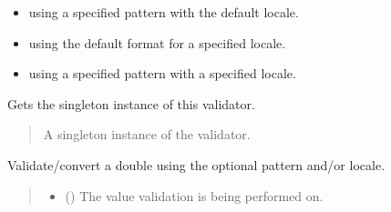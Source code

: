 \documentclass[letterpaper,10pt,english]{sphinxmanual}
\begin{document}
\begin{fulllineitems}
\begin{itemize}
\item {} 
\sphinxAtStartPar
using a specified pattern with the default locale.

\item {} 
\sphinxAtStartPar
using the default format for a specified locale.

\item {} 
\sphinxAtStartPar
using a specified pattern with a specified locale.

\end{itemize}

\begin{fulllineitems}
\label{\detokenize{apache_commons_validator_python.routines:apache_commons_validator_python.routines.double_validator.DoubleValidator.get_instance}}
\pysigstartsignatures
{}
\pysigstopsignatures
\sphinxAtStartPar
Gets the singleton instance of this validator.
\begin{quote}\begin{description}
\sphinxAtStartPar
A singleton instance of the validator.

\end{description}\end{quote}

\end{fulllineitems}


\begin{fulllineitems}
\label{\detokenize{apache_commons_validator_python.routines:apache_commons_validator_python.routines.double_validator.DoubleValidator.validate}}
\pysigstartsignatures
{}
\pysigstopsignatures
\sphinxAtStartPar
Validate/convert a double using the optional pattern and/or locale.
\begin{quote}\begin{description}
\begin{itemize}
\item {} 
\sphinxAtStartPar
{} () \textendash{} The value validation is being performed on.


\end{itemize}
\end{description}
\end{quote}
\end{fulllineitems}
\end{fulllineitems}
\end{document}
